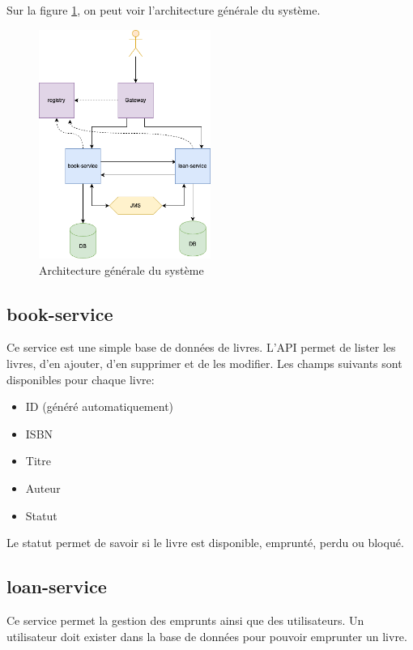 \documentclass[
  french,
  a4paper,
]{scrartcl}
\begin{document}
Sur la figure \ref{fig:architecture}, on peut voir l'architecture générale du système.

\begin{figure}[h]
    \centering
    \includegraphics[width=0.5\textwidth]{img/neolib.png}
    \caption{Architecture générale du système}
    \label{fig:architecture}
\end{figure}

\subsection{book-service}

Ce service est une simple base de données de livres. L'API permet de lister les livres,
d'en ajouter, d'en supprimer et de les modifier. Les champs suivants sont disponibles pour
chaque livre:

\begin{itemize}
    \item ID (généré automatiquement)
    \item ISBN
    \item Titre
    \item Auteur
    \item Statut
\end{itemize}

Le statut permet de savoir si le livre est disponible, emprunté, perdu ou bloqué. 


\subsection{loan-service}

Ce service permet la gestion des emprunts ainsi que des utilisateurs. 
Un utilisateur doit exister dans la base de données pour pouvoir emprunter un livre. 
\end{document}
